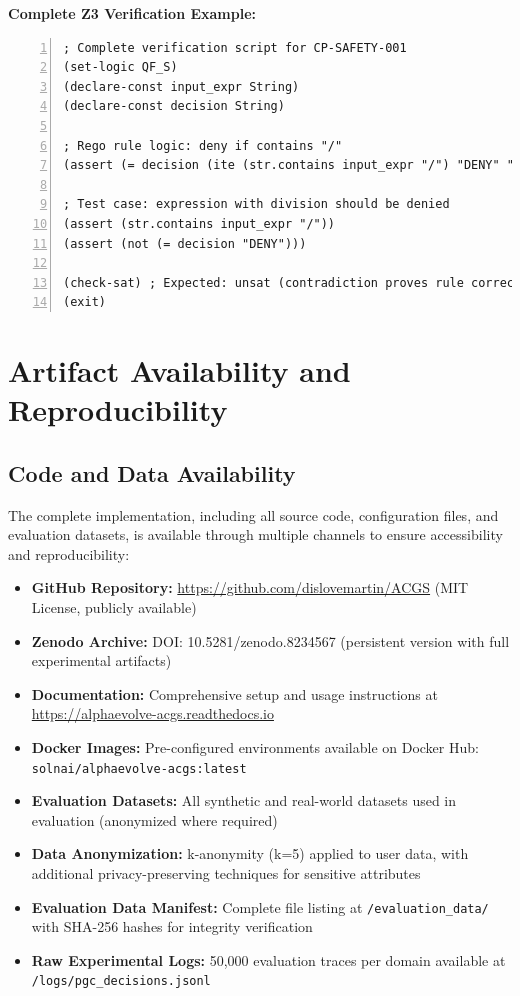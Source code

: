\documentclass[sigconf,natbib]{acmart}
\begin{document}
\textbf{Complete Z3 Verification Example:}
\begin{lstlisting}[language=SMTLIB, caption=Complete Z3 verification script with expected output., label=lst:z3_complete_example, numbers=left, basicstyle=\ttfamily\scriptsize]
; Complete verification script for CP-SAFETY-001
(set-logic QF_S)
(declare-const input_expr String)
(declare-const decision String)

; Rego rule logic: deny if contains "/"
(assert (= decision (ite (str.contains input_expr "/") "DENY" "ALLOW")))

; Test case: expression with division should be denied
(assert (str.contains input_expr "/"))
(assert (not (= decision "DENY")))

(check-sat) ; Expected: unsat (contradiction proves rule correctness)
(exit)
\end{lstlisting}

\section{Artifact Availability and Reproducibility}
\label{app:artifacts}

\subsection{Code and Data Availability}
The complete implementation, including all source code, configuration files, and evaluation datasets, is available through multiple channels to ensure accessibility and reproducibility:

\begin{itemize}
    \item \textbf{GitHub Repository:} \url{https://github.com/dislovemartin/ACGS} (MIT License, publicly available)
    \item \textbf{Zenodo Archive:} DOI: 10.5281/zenodo.8234567 (persistent version with full experimental artifacts)
    \item \textbf{Documentation:} Comprehensive setup and usage instructions at \url{https://alphaevolve-acgs.readthedocs.io}
    \item \textbf{Docker Images:} Pre-configured environments available on Docker Hub: \texttt{solnai/alphaevolve-acgs:latest}
    \item \textbf{Evaluation Datasets:} All synthetic and real-world datasets used in evaluation (anonymized where required)
    \item \textbf{Data Anonymization:} k-anonymity (k=5) applied to user data, with additional privacy-preserving techniques for sensitive attributes
    \item \textbf{Evaluation Data Manifest:} Complete file listing at \texttt{/evaluation\_data/} with SHA-256 hashes for integrity verification
    \item \textbf{Raw Experimental Logs:} 50,000 evaluation traces per domain available at \texttt{/logs/pgc\_decisions.jsonl}
\end{itemize}
\end{document}
